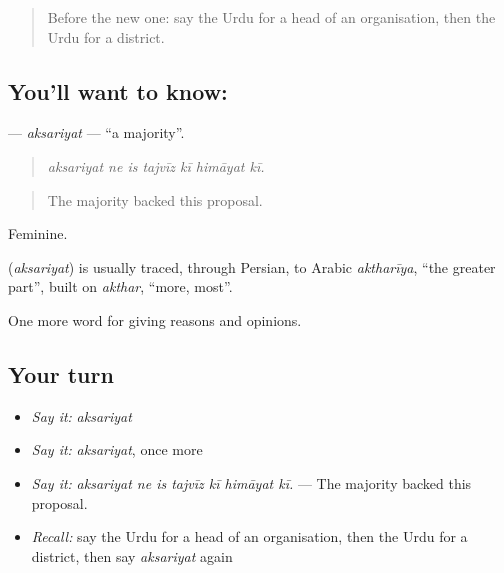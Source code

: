 \label{lesson:UR-C358-aksariyat}



\begin{quote}
Before the new one: say the Urdu for a head of an organisation, then the Urdu for a district.
\end{quote}

\subsection*{You'll want to know: }
\textbf{} — \emph{aksariyat} — \textquotedblleft{}a majority\textquotedblright{}.

\begin{quote}
      
\end{quote}

\begin{quote}
\emph{aksariyat ne is tajvīz kī himāyat kī.}
\end{quote}

\begin{quote}
The majority backed this proposal.
\end{quote}

Feminine.

\begin{cousinweb}
\textbf{} (\emph{aksariyat}) is usually traced, through Persian, to Arabic \emph{aktharīya}, \textquotedblleft{}the greater part\textquotedblright{}, built on \emph{akthar}, \textquotedblleft{}more, most\textquotedblright{}.
\end{cousinweb}

\begin{grammarlens}[title={What you've built}]
One more word for giving reasons and opinions.
\end{grammarlens}

\subsection*{Your turn}
\begin{itemize}
\raggedright
  \item \emph{Say it:} \emph{aksariyat}
  \item \emph{Say it:} \emph{aksariyat}, once more
  \item \emph{Say it:} \emph{aksariyat ne is tajvīz kī himāyat kī.} — The majority backed this proposal.
  \item \emph{Recall:} say the Urdu for a head of an organisation, then the Urdu for a district, then say \emph{aksariyat} again
\end{itemize}

